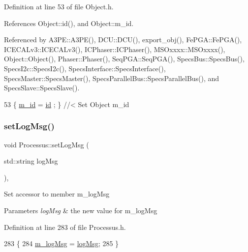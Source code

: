 Definition at line 53 of file Object.\+h.



References Object\+::id(), and Object\+::m\+\_\+id.



Referenced by A3\+P\+E\+::\+A3\+P\+E(), D\+C\+U\+::\+D\+C\+U(), export\+\_\+obj(), Fe\+P\+G\+A\+::\+Fe\+P\+G\+A(), I\+C\+E\+C\+A\+Lv3\+::\+I\+C\+E\+C\+A\+Lv3(), I\+C\+Phaser\+::\+I\+C\+Phaser(), M\+S\+Oxxxx\+::\+M\+S\+Oxxxx(), Object\+::\+Object(), Phaser\+::\+Phaser(), Seq\+P\+G\+A\+::\+Seq\+P\+G\+A(), Specs\+Bus\+::\+Specs\+Bus(), Specs\+I2c\+::\+Specs\+I2c(), Specs\+Interface\+::\+Specs\+Interface(), Specs\+Master\+::\+Specs\+Master(), Specs\+Parallel\+Bus\+::\+Specs\+Parallel\+Bus(), and Specs\+Slave\+::\+Specs\+Slave().


\begin{DoxyCode}
53 \{ \hyperlink{classObject_aca74b9dbfed7b5556ea2d56c65b6b6b0}{m\_id}    = \hyperlink{classObject_af99145335cc61ff6e2798ea17db009d2}{id}    ; \} \textcolor{comment}{//< Set Object m\_id}
\end{DoxyCode}
\mbox{\label{classProcessus_a471833f89047aa9a7ff6200a31c17a1d}} 
\subsubsection{\texorpdfstring{set\+Log\+Msg()}{setLogMsg()}}
{\footnotesize\ttfamily void Processus\+::set\+Log\+Msg (\begin{DoxyParamCaption}\item[{std\+::string}]{log\+Msg }\end{DoxyParamCaption})\hspace{0.3cm}{\ttfamily [inline]}, {\ttfamily [inherited]}}

Set accessor to member m\+\_\+log\+Msg 
\begin{DoxyParams}{Parameters}
{\em log\+Msg} & the new value for m\+\_\+log\+Msg \\
\hline
\end{DoxyParams}


Definition at line 283 of file Processus.\+h.


\begin{DoxyCode}
283                                     \{
284     \hyperlink{classProcessus_a3bc0140a3a69a83951ab7f9986bd2c84}{m\_logMsg} = \hyperlink{classProcessus_a42fdeb17dc13ba854222666b6aa29b61}{logMsg};
285   \}
\end{DoxyCode}
\mbox{\label{classAcquisition_a786da6cff5428020034be23e554e0e1b}} 
